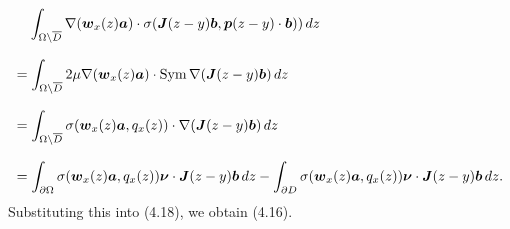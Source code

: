 $$\begin{array}{l}
\displaystyle
\,\,\,\,\,\,
\int_{\Omega\setminus\overline{D}}\nabla(\mbox{\boldmath $w$}_x(z)\mbox{\boldmath $a$})
\cdot\sigma(\mbox{\boldmath $J$}(z-y)\mbox{\boldmath $b$},
\mbox{\boldmath $p$}(z-y)\cdot\mbox{\boldmath $b$}))\,dz
\\
\\
\displaystyle
=\int_{\Omega\setminus\overline{D}}
2\mu\nabla(\mbox{\boldmath $w$}_x(z)\mbox{\boldmath $a$})\cdot\text{Sym}\,\nabla(\mbox{\boldmath $J$}(z-y)\mbox{\boldmath $b$})
\,dz
\\
\\
\displaystyle
=\int_{\Omega\setminus\overline{D}}
\sigma(\mbox{\boldmath $w$}_x(z)\mbox{\boldmath $a$},q_x(z))\cdot\nabla(\mbox{\boldmath $J$}(z-y)\mbox{\boldmath $b$})
\,dz
\\
\\
\displaystyle
=\int_{\partial\Omega}\sigma(\mbox{\boldmath $w$}_x(z)\mbox{\boldmath $a$},q_x(z))\mbox{\boldmath $\nu$}\cdot
\mbox{\boldmath $J$}(z-y)\mbox{\boldmath $b$}\,dz
-\int_{\partial D}\sigma(\mbox{\boldmath $w$}_x(z)\mbox{\boldmath $a$},q_x(z))\mbox{\boldmath $\nu$}\cdot
\mbox{\boldmath $J$}(z-y)\mbox{\boldmath $b$}\,dz.
\end{array}
$$
Substituting this into (4.18), we obtain (4.16).

